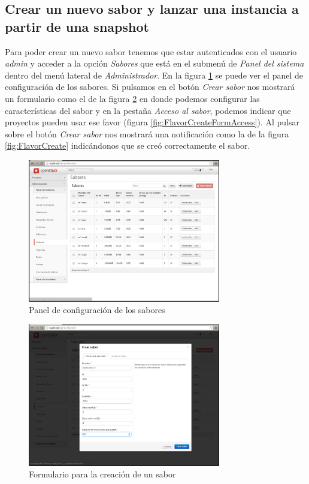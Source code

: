 \documentclass{article}
\begin{document}
\clearpage
\subsection{Crear un nuevo sabor y lanzar una instancia a partir de una snapshot}
	Para poder crear un nuevo sabor tenemos que estar autenticados con el usuario \emph{admin} y acceder a la opción \emph{Sabores} que está en el submenú de \emph{Panel del sistema} dentro del  menú lateral de \emph{Administrador}. En la figura \ref{fig:FlavorInit} se puede ver el panel de configuración de los sabores. Si pulsamos en el botón \emph{Crear sabor} nos mostrará un formulario como el de la figura \ref{fig:FlavorCreateForm} en donde podemos configurar las características del sabor y en la pestaña \emph{Acceso al sabor}, podemos indicar que proyectos pueden usar ese favor (figura \ref{fig:FlavorCreateFormAccess}). Al pulsar sobre el botón \emph{Crear sabor} nos mostrará una notificación como la de la figura \ref{fig:FlavorCreate} indicándonos que se creó correctamente el sabor.

\begin{figure}[h]
  \centering
    \includegraphics[width=0.75\textwidth]{img/m_063.png}
  \caption{Panel de configuración de los sabores}
  \label{fig:FlavorInit}
\end{figure}	

\begin{figure}[h]
  \centering
    \includegraphics[width=0.75\textwidth]{img/m_064.png}
  \caption{Formulario para la creación de un sabor}
  \label{fig:FlavorCreateForm}
\end{figure}	
\end{document}
